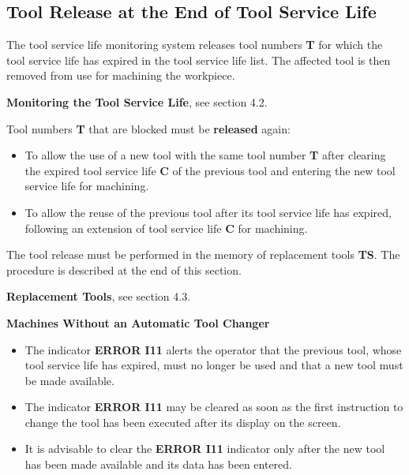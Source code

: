 \newpage

\subsection{Tool Release at the End of Tool Service Life}

The tool service life monitoring system releases tool numbers \textbf{T} for which the tool service life has expired in the tool service life list. The affected tool is then removed from use for machining the workpiece.

\textbf{Monitoring the Tool Service Life}, see section 4.2.

Tool numbers \textbf{T} that are blocked must be \textbf{released} again:

\begin{itemize}
    \item To allow the use of a new tool with the same tool number \textbf{T} after clearing the expired tool service life \textbf{C} of the previous tool and entering the new tool service life for machining.
    
    \item To allow the reuse of the previous tool after its tool service life has expired, following an extension of tool service life \textbf{C} for machining.
\end{itemize}

The tool release must be performed in the memory of replacement tools \textbf{TS}. The procedure is described at the end of this section.

\textbf{Replacement Tools}, see section 4.3.

\vspace{.5cm}

\textbf{Machines Without an Automatic Tool Changer}

\begin{itemize}
    \item The indicator \textbf{ERROR I11} alerts the operator that the previous tool, whose tool service life has expired, must no longer be used and that a new tool must be made available.

    \item The indicator \textbf{ERROR I11} may be cleared as soon as the first instruction to change the tool has been executed after its display on the screen.

    \item It is advisable to clear the \textbf{ERROR I11} indicator only after the new tool has been made available and its data has been entered.
\end{itemize}

